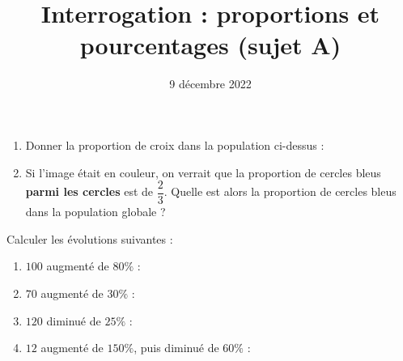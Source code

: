 \documentclass[
	classe=$2^{de}$,
	landscape,
	twocolumn,
	headerTitle={Interrogation}
]{évaluation}
\date{9 décembre 2022}
\begin{document}

\title{Interrogation : proportions et pourcentages (sujet A)}
\maketitle

\begin{exercice}
	\begin{center}
	\end{center}

	\begin{enumerate}
		\item Donner la proportion de croix dans la population ci-dessus : 
		\item Si l'image était en couleur, on verrait que la proportion de cercles bleus \textbf{parmi les cercles} est de $\dfrac{2}{3}$. Quelle est alors la proportion de cercles bleus dans la population globale ? 
	\end{enumerate}
\end{exercice}

\begin{exercice}
	Calculer les évolutions suivantes :
	\begin{enumerate}
		\item $100$ augmenté de $80\%$ : 
		\item $70$ augmenté de $30\%$ : 
		\item $120$ diminué de $25\%$ : 
		\item $12$ augmenté de $150\%$, puis diminué de $60\%$ : 
	\end{enumerate}
\end{exercice}
\end{document}
